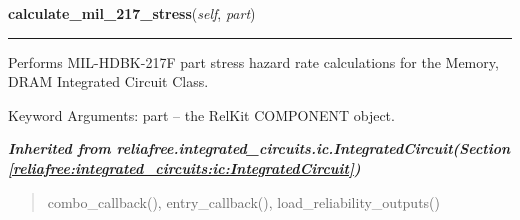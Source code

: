    \vspace{0.5ex}

\hspace{.8\funcindent}\begin{boxedminipage}{\funcwidth}

    \raggedright \textbf{calculate\_mil\_217\_stress}(\textit{self}, \textit{part})

    \vspace{-1.5ex}

    \rule{\textwidth}{0.5\fboxrule}
\setlength{\parskip}{2ex}
    Performs MIL-HDBK-217F part stress hazard rate calculations for the 
    Memory, DRAM Integrated Circuit Class.

    Keyword Arguments: part -- the RelKit COMPONENT object.

\setlength{\parskip}{1ex}
    \end{boxedminipage}


\large{\textbf{\textit{Inherited from reliafree.integrated\_circuits.ic.IntegratedCircuit\textit{(Section \ref{reliafree:integrated_circuits:ic:IntegratedCircuit})}}}}

\begin{quote}
combo\_callback(), entry\_callback(), load\_reliability\_outputs()
\end{quote}
